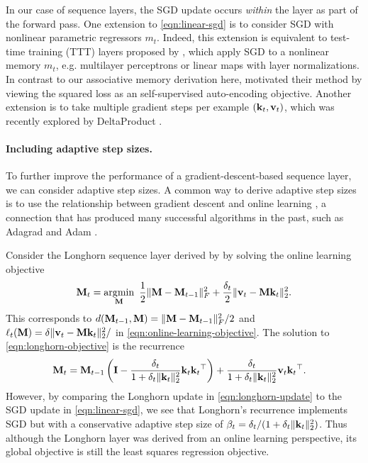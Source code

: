 \documentclass[notitlepage, 11pt]{article}
\newcommand*{\memory}{{m}}
\begin{document}
In our case of sequence layers, the SGD update occurs \emph{within} the layer as part of the forward pass.
One extension to \autoref{eqn:linear-sgd} is to consider SGD with nonlinear parametric regressors $\memory_t$.
Indeed, this extension is equivalent to test-time training (TTT) layers proposed by \citet{Sun2024LearningLearnTest}, which apply SGD to a nonlinear memory $\memory_t$, e.g. multilayer perceptrons or linear maps with layer normalizations.
In contrast to our associative memory derivation here, \citet{Sun2024LearningLearnTest} motivated their method by viewing the squared loss as an self-supervised auto-encoding objective.
Another extension is to take multiple gradient steps per example $(\mathbf{k}_t, \mathbf{v}_t)$, which was recently explored by DeltaProduct \citep{Siems2025DeltaProductIncreasingExpressivity}.


\paragraph{Including adaptive step sizes.}
To further improve the performance of a gradient-descent-based sequence layer, we can consider adaptive step sizes.
A common way to derive adaptive step sizes is to use the relationship between gradient descent and online learning \citep{Cesa-Bianchi2004GeneralizationAbilityOnline,Zinkevich2003OnlineConvexProgramming}, a connection that has produced many successful algorithms in the past, such as Adagrad \citep{Duchi2011AdaptiveSubgradientMethods} and Adam \citep{Kingma2015AdamMethodStochastic}.

Consider the Longhorn sequence layer derived by \citet{Liu2024LonghornStateSpace} by solving the online learning objective
\begin{align}
\mathbf{M}_{t} = \operatorname*{\arg\!\min}_{\mathbf{M}}\ \frac{1}{2}\lVert\mathbf{M} - \mathbf{M}_{t-1}\rVert_F^2 + \frac{\delta_t}{2} \lVert\mathbf{v}_t - \mathbf{M} \mathbf{k}_t\rVert_2^2.\label{eqn:longhorn-objective}
\end{align}
This corresponds to $d(\mathbf{M}_{t-1}, \mathbf{M}) = \lVert\mathbf{M} - \mathbf{M}_{t-1}\rVert_F^2/2$ and $\ell_t(\mathbf{M}) = \delta \lVert\mathbf{v}_t - \mathbf{M} \mathbf{k}_t\rVert_2^2/$ in \autoref{eqn:online-learning-objective}.
The solution to \autoref{eqn:longhorn-objective} is the recurrence
\begin{align}
    \mathbf{M}_{t} &= \mathbf{M}_{t-1}\left(\mathbf{I} - \frac{\delta_t}{1 + \delta_t\lVert\mathbf{k}_t\rVert_2^2} {\mathbf{k}_t\mathbf{k}_t{}^\top}\right) + \frac{\delta_t}{1 + \delta_t \lVert\mathbf{k}_t\rVert_2^2}\mathbf{v}_t\mathbf{k}_t{}^\top.\label{eqn:longhorn-update}
\end{align}
However, by comparing the Longhorn update in \autoref{eqn:longhorn-update} to the SGD update in \autoref{eqn:linear-sgd}, we see that Longhorn's recurrence implements SGD but with a conservative adaptive step size of $\beta_t = \delta_t / (1 + \delta_t\lVert\mathbf{k}_t\rVert_2^2)$.
Thus although the Longhorn layer was derived from an online learning perspective, its global objective is still the least squares regression objective.
\end{document}

